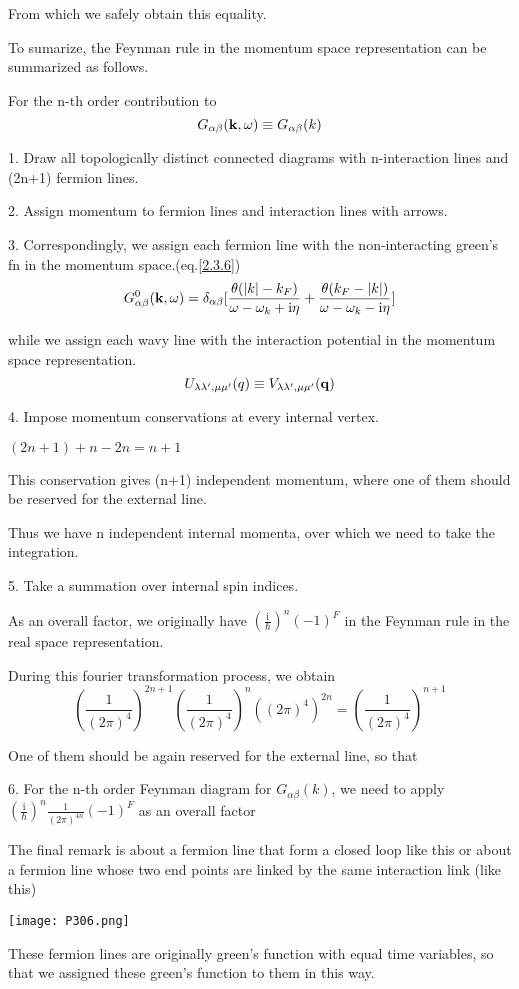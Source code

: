From which  we safely obtain this equality.

To sumarize, the Feynman rule in the momentum space representation can be summarized as follows.

For the n-th order contribution to $$G_{\alpha\beta}({\bf k},\omega)\equiv G_{\alpha\beta}(k)$$

1. Draw all topologically distinct connected diagrams with n-interaction lines and (2n+1) fermion lines.

2. Assign momentum to fermion lines and interaction lines with arrows.

3. Correspondingly, we assign each fermion line with the non-interacting green's fn in the momentum space.(eq.\eqref{2.3.6})
$$G_{\alpha\beta}^0({\bf k},\omega)=\delta_{\alpha\beta}[\frac{\theta(|k|-k_F)}{\omega-\omega_k+\mathrm{i}\eta}+\frac{\theta(k_F-|k|)}{\omega-\omega_k-\mathrm{i}\eta}]$$

while we assign each wavy line with the interaction potential in the momentum space representation.
$$U_{\lambda\lambda',\mu\mu'}(q)\equiv V_{\lambda\lambda',\mu\mu'}({\bf q})$$

4. Impose momentum conservations at every internal vertex.

$(2n+1)+n-2n=n+1$

This conservation gives (n+1) independent momentum, where one of them should be reserved for the external line.

Thus we have n independent internal momenta, over which we need to take the integration.

5. Take a summation over internal spin indices.

As an overall factor, we originally have $(\frac{\mathrm{i}}{\hbar})^n(-1)^F$ in the Feynman rule in the real space representation.

During this fourier transformation process, we obtain
$$(\frac{1}{(2\pi)^4})^{2n+1}(\frac{1}{(2\pi)^4})^n((2\pi)^4)^{2n}=(\frac{1}{(2\pi)^4})^{n+1}$$

One of them should be again reserved for the external line, so that

6. For the n-th order Feynman diagram for $G_{\alpha\beta}(k)$, we need to apply $(\frac{\mathrm{i}}{\hbar})^n\frac{1}{(2\pi)^{4n}}(-1)^F$ as an overall factor

The final remark  is about a fermion line that form a closed loop like this or about a fermion line whose two end points are linked by the same interaction link (like this)
\begin{center}
\texttt{[image: P306.png]}
\end{center}
These fermion lines are originally green's function with equal time variables, so that we assigned these green's function to them in this way.

